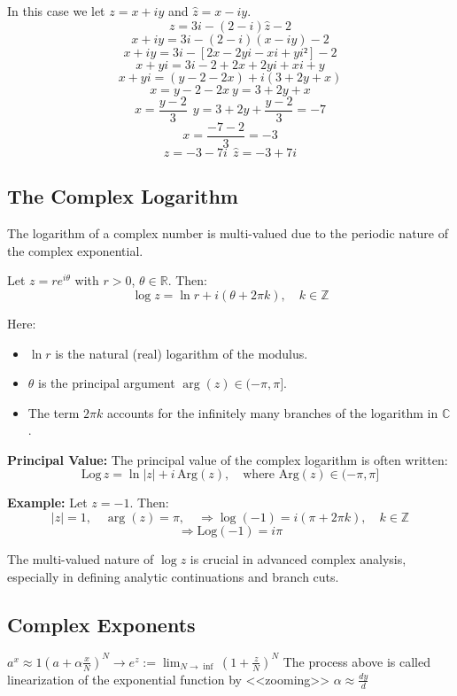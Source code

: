In this case we let \( z = x + iy \) and \( \hat{z} = x - iy \).
\[
	z = 3i - (2 - i)\hat{z} - 2
\]
\[
	x + iy = 3i - (2 - i)(x - iy) - 2
\]
\[
	x + iy = 3i - [2x - 2yi -xi +yi²] - 2
\]
\[
	x + yi = 3i - 2 + 2x + 2yi + xi + y
\]
\[
	x + yi = (y - 2 -2x) + i(3 + 2y + x)
\]
\[
	x = y - 2 -2x\ y = 3 + 2y + x
\]
\[
	x = \frac{y - 2}{3}\ \ y = 3 + 2y + \frac{y-2}{3} = -7
\]
\[
	x = \frac{-7 -2}{3} = -3
\]
\[
	z = -3 -7i\ \ \hat{z} = -3 + 7i
\]
\subsection{The Complex Logarithm}

The logarithm of a complex number is multi-valued due to the periodic nature of the complex exponential.

Let \( z = re^{i\theta} \) with \( r > 0 \), \( \theta \in \mathbb{R} \). Then:
\[
	\log z = \ln r + i(\theta + 2\pi k), \quad k \in \mathbb{Z}
\]

Here:
\begin{itemize}
	\item \( \ln r \) is the natural (real) logarithm of the modulus.
	\item \( \theta \) is the principal argument \( \arg(z) \in (-\pi, \pi] \).
	\item The term \( 2\pi k \) accounts for the infinitely many branches of the logarithm in \( \mathbb{C} \).
\end{itemize}

\textbf{Principal Value:}
The principal value of the complex logarithm is often written:
\[
	\mathrm{Log}\,z = \ln |z| + i\,\mathrm{Arg}(z), \quad \text{where } \mathrm{Arg}(z) \in (-\pi, \pi]
\]

\textbf{Example:}
Let \( z = -1 \). Then:
\[
	|z| = 1, \quad \arg(z) = \pi, \quad \Rightarrow \log(-1) = i(\pi + 2\pi k), \quad k \in \mathbb{Z}
\]
\[
	\Rightarrow \mathrm{Log}(-1) = i\pi
\]

The multi-valued nature of \( \log z \) is crucial in advanced complex analysis, especially in defining analytic continuations and branch cuts.

\subsection{Complex Exponents}
$a^x \approx 1 \left(a + \alpha \frac{x}{N} \right)^N \rightarrow e^z := \lim_{N \rightarrow \inf} \left( 1 + \frac{z}{N}\right)^N $
The process above is called linearization of the exponential function by <<zooming>>  $\alpha \approx \frac{dy}{d}$

